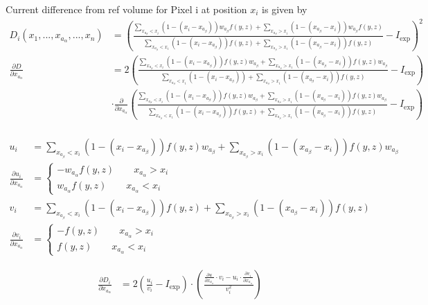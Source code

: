 \documentclass{article}
\begin{document}
Current difference from ref volume for Pixel i at position $x_i$ is given by
\begin{align*}
D_i(x_1,..., x_{a_\alpha}, ..., x_n) &= \left(\frac{\sum_{x_{a_\beta} < x_i} (1-(x_i - x_{a_\beta}))w_{a_\beta}f(y,z) + \sum_{x_{a_\beta} > x_i} (1-(x_{a_\beta}-x_i))w_{a_\beta}f(y,z)}{\sum_{x_{a_\beta} < x_i} (1-(x_i - x_{a_\beta}))f(y,z) + \sum_{x_{a_\beta} > x_i} (1-(x_{a_\beta}-x_i))f(y,z)} - I_{\mathrm{exp}}\right)^2\\
\frac{\partial D}{\partial x_{a_\alpha}} &= 2\left(\frac{\sum_{x_{a_\beta} < x_i} (1-(x_i - x_{a_\beta}))f(y,z)w_{a_\beta} + \sum_{x_{a_\beta} > x_i} (1-(x_{a_\beta}-x_i))f(y,z)w_{a_\beta}}{\sum_{x_{a_\beta} < x_i} (1-(x_i - x_{a_\beta})) + \sum_{x_{a_\beta} > x_i} (1-(x_{a_\beta}-x_i))f(y,z)} - I_{\mathrm{exp}}\right)\\
& \cdot \frac{\partial}{\partial x_{a_\alpha}} \left(\frac{\sum_{x_{a_\beta} < x_i} (1-(x_i - x_{a_\beta}))f(y,z)w_{a_\beta} + \sum_{x_{a_\beta} > x_i} (1-(x_{a_\beta}-x_i))f(y,z)w_{a_\beta}}{\sum_{x_{a_\beta} < x_i} (1-(x_i - x_{a_\beta}))f(y,z) + \sum_{x_{a_\beta} > x_i} (1-(x_{a_\beta}-x_i))f(y,z)} - I_{\mathrm{exp}}\right)\\
\end{align*}

\begin{align*}
u_i &= \sum_{x_{a_\beta} < x_i} (1-(x_i - x_{a_\beta}))f(y,z)w_{a_\beta} + \sum_{x_{a_\beta} > x_i} (1-(x_{a_\beta}-x_i))f(y,z)w_{a_\beta}\\
\frac{\partial u_i}{\partial x_{a_\alpha}} &= \begin{cases} -w_{a_\alpha}f(y,z)\qquad x_{a_\alpha} > x_i\\w_{a_\alpha}f(y,z)\qquad x_{a_\alpha} < x_i\end{cases}\\
v_i &= \sum_{x_{a_\beta} < x_i} (1-(x_i - x_{a_\beta}))f(y,z) + \sum_{x_{a_\beta} > x_i} (1-(x_{a_\beta}-x_i))f(y,z)\\
\frac{\partial v_i}{\partial x_{a_\alpha}} &= \begin{cases} -f(y,z)\qquad x_{a_\alpha} > x_i\\f(y,z)\qquad x_{a_\alpha} < x_i\end{cases}
\end{align*}


\begin{align*}
\frac{\partial D_i}{\partial x_{a_\alpha}} &= 2\left(\frac{u_i}{v_i} - I_{\mathrm{exp}}\right)\cdot \left(\frac{\frac{\partial u}{\partial x_{a_\alpha}}\cdot v_i - u_i\cdot\frac{\partial v_i}{\partial x_{a_\alpha}}}{v_i^2}\right)\\
\end{align*}
\end{document}
